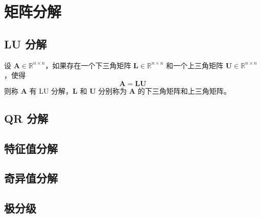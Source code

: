 \section{矩阵分解}

\subsection{LU 分解}

\begin{definition}[LU 分解]
设 $\mathbf{A} \in \mathbb{R}^{n \times n}$，如果存在一个下三角矩阵 $\mathbf{L} \in \mathbb{R}^{n \times n}$ 和一个上三角矩阵 $\mathbf{U} \in \mathbb{R}^{n \times n}$，使得
\[
\mathbf{A} = \mathbf{L} \mathbf{U}
\]
则称 $\mathbf{A}$ 有 LU 分解，$\mathbf{L}$ 和 $\mathbf{U}$ 分别称为 $\mathbf{A}$ 的下三角矩阵和上三角矩阵。
\end{definition}

\begin{proposition}
    
\end{proposition}

\subsection{QR 分解}


\subsection{特征值分解}


\subsection{奇异值分解}

\subsection{极分级}

\newpage